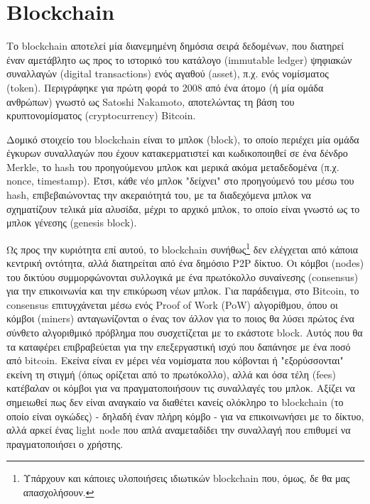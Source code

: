 \section{Blockchain} \label{section:2-5-blockchain}

Το blockchain αποτελεί μία διανεμημένη δημόσια σειρά δεδομένων, που διατηρεί έναν αμετάβλητο ως προς το ιστορικό του κατάλογο (immutable ledger) ψηφιακών συναλλαγών (digital transactions) ενός αγαθού (asset), π.χ. ενός νομίσματος (token). Περιγράφηκε για πρώτη φορά το 2008 από ένα άτομο (ή μία ομάδα ανθρώπων) γνωστό ως Satoshi Nakamoto, αποτελώντας τη βάση του κρυπτονομίσματος (cryptocurrency) Bitcoin.\cite{2.5-bitcoin}

Δομικό στοιχείο του blockchain είναι το μπλοκ (block), το οποίο περιέχει μία ομάδα έγκυρων συναλλαγών που έχουν κατακερματιστεί και κωδικοποιηθεί σε ένα δένδρο Merkle, το hash του προηγούμενου μπλοκ και μερικά ακόμα μεταδεδομένα (π.χ. nonce, timestamp). Έτσι, κάθε νέο μπλοκ "δείχνει" στο προηγούμενό του μέσω του hash, επιβεβαιώνοντας την ακεραιότητά του, με τα διαδεχόμενα μπλοκ να σχηματίζουν τελικά μία αλυσίδα, μέχρι το αρχικό μπλοκ, το οποίο είναι γνωστό ως το μπλοκ γένεσης (genesis block).\cite{2.5-blockchain}


Ως προς την κυριότητα επί αυτού, το blockchain συνήθως\footnote{Υπάρχουν και κάποιες υλοποιήσεις ιδιωτικών blockchain που, όμως, δε θα μας απασχολήσουν.} δεν ελέγχεται από κάποια κεντρική οντότητα, αλλά διατηρείται από ένα δημόσιο P2P δίκτυο. Οι κόμβοι (nodes) του δικτύου συμμορφώνονται συλλογικά με ένα πρωτόκολλο συναίνεσης (consensus) για την επικοινωνία και την επικύρωση νέων μπλοκ. Για παράδειγμα, στο Bitcoin, το consensus επιτυγχάνεται μέσω ενός Proof of Work (PoW) αλγορίθμου, όπου οι κόμβοι (miners) ανταγωνίζονται ο ένας τον άλλον για το ποιος θα λύσει πρώτος ένα σύνθετο αλγοριθμικό πρόβλημα που συσχετίζεται με το εκάστοτε block. Αυτός που θα τα καταφέρει επιβραβεύεται για την επεξεργαστική ισχύ που δαπάνησε με ένα ποσό από bitcoin. Εκείνα είναι εν μέρει νέα νομίσματα που κόβονται ή "εξορύσσονται" εκείνη τη στιγμή (όπως ορίζεται από το πρωτόκολλο), αλλά και όσα τέλη (fees) κατέβαλαν οι κόμβοι για να πραγματοποιήσουν τις συναλλαγές του μπλοκ. Αξίζει να σημειωθεί πως δεν είναι αναγκαίο να διαθέτει κανείς ολόκληρο το blockchain (το οποίο είναι ογκώδες) - δηλαδή έναν πλήρη κόμβο - για να επικοινωνήσει με το δίκτυο, αλλά αρκεί ένας light node που απλά αναμεταδίδει την συναλλαγή που επιθυμεί να πραγματοποιήσει ο χρήστης.

